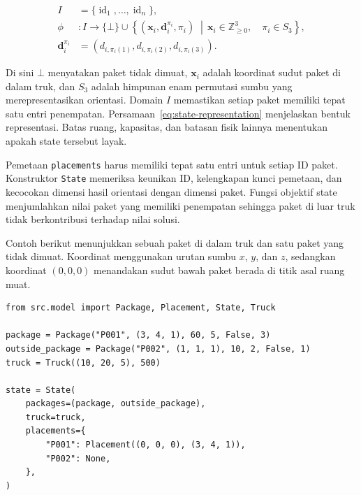 \begin{equation}
    \begin{aligned}
        I                    & = \{\operatorname{id}_1,\ldots,\operatorname{id}_n\}, \\
        \phi                 & : I \longrightarrow \{\bot\} \cup
        \left\{(\mathbf{x}_i,\mathbf{d}_i^{\pi_i},\pi_i)\;\middle|\,
        \mathbf{x}_i \in \mathbb{Z}_{\geq 0}^{3},\quad \pi_i \in S_3\right\},           \\
        \mathbf{d}_i^{\pi_i} & = (d_{i,\pi_i(1)},d_{i,\pi_i(2)},d_{i,\pi_i(3)}).
    \end{aligned}
    \label{eq:state-representation}
\end{equation}

Di sini $\bot$ menyatakan paket tidak dimuat, $\mathbf{x}_i$ adalah koordinat sudut paket di dalam truk, dan $S_3$ adalah himpunan enam permutasi sumbu yang merepresentasikan orientasi. Domain $I$ memastikan setiap paket memiliki tepat satu entri penempatan. Persamaan~\ref{eq:state-representation} menjelaskan bentuk representasi. Batas ruang, kapasitas, dan batasan fisik lainnya menentukan apakah state tersebut layak.

Pemetaan \texttt{placements} harus memiliki tepat satu entri untuk setiap ID paket. Konstruktor \texttt{State} memeriksa keunikan ID, kelengkapan kunci pemetaan, dan kecocokan dimensi hasil orientasi dengan dimensi paket. Fungsi objektif state menjumlahkan nilai paket yang memiliki penempatan sehingga paket di luar truk tidak berkontribusi terhadap nilai solusi.

Contoh berikut menunjukkan sebuah paket di dalam truk dan satu paket yang tidak dimuat. Koordinat menggunakan urutan sumbu $x$, $y$, dan $z$, sedangkan koordinat $(0,0,0)$ menandakan sudut bawah paket berada di titik asal ruang muat.

\begin{lstlisting}[caption={Contoh pembentukan state pemuatan},label={lst:state-example}]
from src.model import Package, Placement, State, Truck

package = Package("P001", (3, 4, 1), 60, 5, False, 3)
outside_package = Package("P002", (1, 1, 1), 10, 2, False, 1)
truck = Truck((10, 20, 5), 500)

state = State(
    packages=(package, outside_package),
    truck=truck,
    placements={
        "P001": Placement((0, 0, 0), (3, 4, 1)),
        "P002": None,
    },
)
\end{lstlisting}

